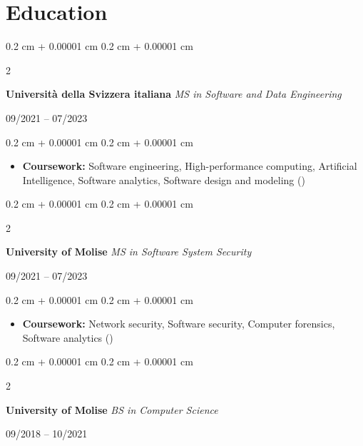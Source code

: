 \documentclass[10pt, letterpaper]{article}
\newenvironment{highlights}{
    \begin{itemize}[
        topsep=0.10 cm,
        parsep=0.10 cm,
        partopsep=0pt,
        itemsep=0pt,
        leftmargin=0.4 cm + 10pt
    ]
}{
    \end{itemize}
} %
\newenvironment{onecolentry}{
    \begin{adjustwidth}{
        0.2 cm + 0.00001 cm
    }{
        0.2 cm + 0.00001 cm
    }
}{
    \end{adjustwidth}
} %
\newenvironment{twocolentry}[2][]{
    \onecolentry
    \def\secondColumn{#2}
    \setcolumnwidth{\fill, 4.5 cm}
    \begin{paracol}{2}
}{
    \switchcolumn \raggedleft \secondColumn
    \end{paracol}
    \endonecolentry
} %
\let\hrefWithoutArrow\href
\renewcommand{\href}[2]{\hrefWithoutArrow{#1}{\ifthenelse{\equal{#2}{}}{ }{#2 }\raisebox{.15ex}{\footnotesize \faExternalLink*}}}
\begin{document}
\newpage
       
    \section{Education}   
        \begin{twocolentry}{
                 
        09/2021 – 07/2023}
            \textbf{Università della Svizzera italiana} \textit{MS in Software and Data Engineering}
        \end{twocolentry}

        \vspace{0.10 cm}
        \begin{onecolentry}
            \begin{highlights}
                \item \textbf{Coursework:} Software engineering, High-performance computing, Artificial Intelligence, Software analytics, Software design and modeling (\href{https://www.usi.ch/en/education/master/software-and-data-engineering}{MSDE})
            \end{highlights}
        \end{onecolentry}
        \vspace{0.2 cm}

        \begin{twocolentry}{
                 
        09/2021 – 07/2023}
            \textbf{University of Molise} \textit{MS in Software System Security}
        \end{twocolentry}

        \vspace{0.10 cm}
        \begin{onecolentry}
            \begin{highlights}
                \item \textbf{Coursework:} Network security, Software security, Computer forensics, Software analytics (\href{https://www3.unimol.it/dipartimenti/bioscienze-e-territorio/corso/sicurezza_sistemi_software_home}{SSS})
            \end{highlights}
        \end{onecolentry}
        \vspace{0.2 cm}

        \begin{twocolentry}{
                 
        09/2018 – 10/2021}
            \textbf{University of Molise} \textit{BS in Computer Science}
        \end{twocolentry}
\end{document}
